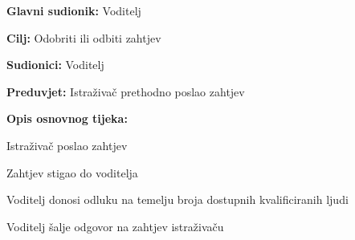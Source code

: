 					\noindent {}
					\begin{packed_item}
						
						\item \textbf{Glavni sudionik: }Voditelj
						\item  \textbf{Cilj:} Odobriti ili odbiti zahtjev
						\item  \textbf{Sudionici:} Voditelj
						\item  \textbf{Preduvjet:} Istraživač prethodno poslao zahtjev
						\item  \textbf{Opis osnovnog tijeka:}
						
						\item[] \begin{packed_enum}

							\item Istraživač poslao zahtjev							
							\item Zahtjev stigao do voditelja
							\item Voditelj donosi odluku na temelju broja dostupnih kvalificiranih ljudi
							\item Voditelj šalje odgovor na zahtjev istraživaču
							
						\end{packed_enum}
					\end{packed_item}
					
